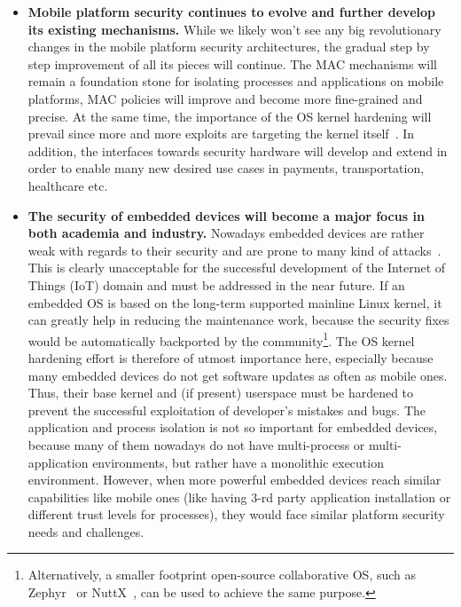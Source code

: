 \begin{itemize}
	\item \textbf{Mobile platform security continues to evolve and further develop its existing mechanisms.} While we likely won't see any big revolutionary changes in the mobile platform security architectures, the gradual step by step improvement of all its pieces will continue. The MAC mechanisms will remain a foundation stone for isolating processes and applications on mobile platforms, MAC policies will improve and become more fine-grained and precise. At the same time, the importance of the OS kernel hardening will prevail since more and more exploits are targeting the kernel itself~\cite{stoep2016android}. In addition, the interfaces towards security hardware will develop and extend in order to enable many new desired use cases in payments, transportation, healthcare etc.
		
	\item \textbf{The security of embedded devices will become a major focus in both academia and industry.} Nowadays embedded devices are rather weak with regards to their security and are prone to many kind of attacks~\cite{Choo2016}. This is clearly unacceptable for the successful development of the Internet of Things (IoT) domain and must be addressed in the near future. If an embedded OS is based on the long-term supported mainline Linux kernel, it can greatly help in reducing the maintenance work, because the security fixes would be automatically backported by the community\footnote{Alternatively, a smaller footprint open-source collaborative OS, such as Zephyr~\cite{zephyr} or NuttX~\cite{NuttX}, can be used to achieve the same purpose.}. The OS kernel hardening effort is therefore of utmost importance here, especially because many embedded devices do not get software updates as often as mobile ones. Thus, their base kernel and (if present) userspace must be hardened to prevent the successful exploitation of developer's mistakes and bugs. The application and process isolation is not so important for embedded devices, because many of them nowadays do not have multi-process or multi-application environments, but rather have a monolithic execution environment. However, when more powerful embedded devices reach similar capabilities like mobile ones (like having 3-rd party application installation or different trust levels for processes), they would face similar platform security needs and challenges.
	

\end{itemize}
